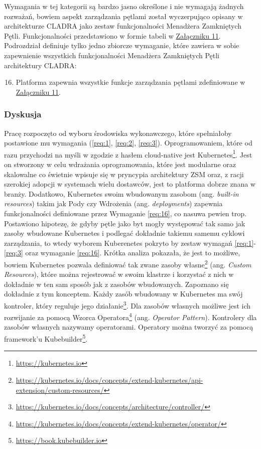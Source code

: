 Wymagania w tej kategorii są bardzo jasno określone i nie wymagają żadnych rozważań, bowiem aspekt zarządzania pętlami został wyczerpująco opisany w architekturze CLADRA jako zestaw funkcjonalności Menadżera Zamkniętych Pętli. Funkcjonalności przedstawiono w formie tabeli w \hyperlink{appendix:11}{Załączniku 11}. Podrozdział definiuje tylko jedno zbiorcze wymaganie, które zawiera w sobie zapewnienie wszystkich funkcjonalności Menadżera Zamkniętych Pętli architektury CLADRA:

\begin{enumerate}
    \setcounter{enumi}{15} 
    \item \label{req:16} Platforma zapewnia wszystkie funkcje zarządzania pętlami zdefiniowane w \hyperlink{appendix:11}{Załączniku 11}.
\end{enumerate}

\subsubsection{Dyskusja}

Pracę rozpoczęto od wyboru środowiska wykonawczego, które spełniałoby postawione mu wymagania (\ref{req:1}, \ref{req:2}, \ref{req:3}). Oprogramowaniem, które od razu przychodzi na myśli w zgodzie z hasłem cloud-native jest Kubernetes\footnote{\url{https://kubernetes.io}}. Jest on stworzony w celu wdrażania oprogramowania, które jest modularne oraz skalowalne co świetnie wpisuje się w pryncypia architektury ZSM oraz, z racji szerokiej adopcji w systemach wielu dostawców, jest to platforma dobrze znana w branży. Dodatkowo, Kubernetes swoim wbudowanym zasobom (ang. \textit{built-in resources}) takim jak Pody czy Wdrożenia (ang. \textit{deployments}) zapewnia funkcjonalności definiowane przez Wymaganie \ref{req:16}, co nasuwa pewien trop. Postawiono hipotezę, że gdyby pętle jako byt mogły występować tak samo jak zasoby wbudowane Kubernetes i podlegać dokładnie takiemu samemu cyklowi zarządzania, to wtedy wyborem Kuberenetes pokryto by zestaw wymagań \ref{req:1}-\ref{req:3} oraz wymaganie \ref{req:16}. Krótka analiza pokazała, że jest to możliwe, bowiem Kubernetes pozwala definiować tak zwane zasoby własne\footnote{\url{https://kubernetes.io/docs/concepts/extend-kubernetes/api-extension/custom-resources/}} (ang. \textit{Custom Resources}), które można rejestrować w swoim klastrze i korzystać z nich w dokładnie w ten sam sposób jak z zasobów wbudowanych. Zapoznano się dokładnie z tym konceptem. Każdy zasób wbudowany w Kubernetes ma swój kontroler, który reguluje jego działanie\footnote{\url{https://kubernetes.io/docs/concepts/architecture/controller/}}. Dla zasobów własnych możliwe jest ich rozwijanie za pomocą Wzorca Operatora\footnote{\url{https://kubernetes.io/docs/concepts/extend-kubernetes/operator/}} (ang. \textit{Operator Pattern}). Kontrolery dla zasobów własnych nazywamy operatorami. Operatory można tworzyć za pomocą framework'u Kubebuilder\footnote{\url{https://book.kubebuilder.io}}.

